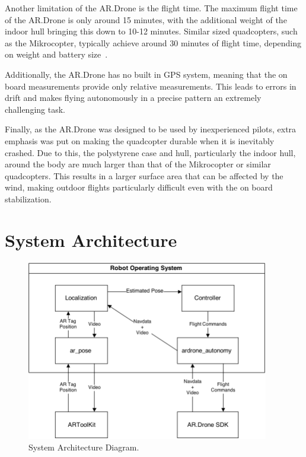         Another limitation of the AR.Drone is the flight time. The maximum flight time of the AR.Drone is only around 15 minutes, with the additional weight of the indoor hull bringing this down to 10-12 minutes. Similar sized quadcopters, such as the Mikrocopter, typically achieve around 30 minutes of flight time, depending on weight and battery size~\cite{Mikrocopter}.

        Additionally, the AR.Drone has no built in GPS system, meaning that the on board measurements provide only relative measurements. This leads to errors in drift and makes flying autonomously in a precise pattern an extremely challenging task.

        Finally, as the AR.Drone was designed to be used by inexperienced pilots, extra emphasis was put on making the quadcopter durable when it is inevitably crashed. Due to this, the polystyrene case and hull, particularly the indoor hull, around the body are much larger than that of the Mikrocopter or similar quadcopters. This results in a larger surface area that can be affected by the wind, making outdoor flights particularly difficult even with the on board stabilization. 

\section{System Architecture}

    \begin{figure}[ht]
            \centering
            \includegraphics[width=400px]{../images/system.png}
            \caption{System Architecture Diagram.}\label{fig:system}
    \end{figure}

